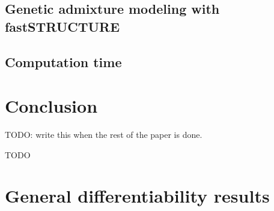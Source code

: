 \documentclass[ba]{imsart}
\begin{document}
    \subsection{Genetic admixture modeling with fastSTRUCTURE}
    

    \subsection{Computation time}
    

\section{Conclusion}
TODO: write this when the rest of the paper is done.





\begin{acks}[Acknowledgments]
  TODO
\end{acks}



\appendix

% 

\section{General differentiability results}

\end{document}
